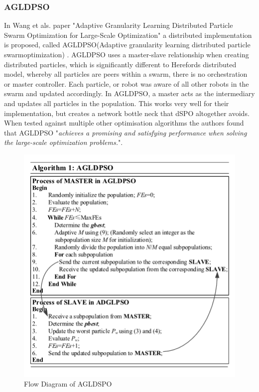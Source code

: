 \documentclass[oneside,12pt]{book}
\begin{document}
\subsubsection{AGLDPSO}
In Wang et als. paper "Adaptive Granularity Learning Distributed Particle Swarm Optimization for Large-Scale Optimization" a distributed implementation is proposed, called AGLDPSO(Adaptive granularity learning distributed particle swarmoptimization) \cite{wang2020adaptive}. AGLDPSO uses a master-slave relationship when creating distributed particles, which is significantly different to Herefords distributed model, whereby all particles are peers within a swarm, there is no orchestration or master controller. Each particle, or robot was aware of all other robots in the swarm and updated accordingly. In AGLDPSO, a master acts as the intermediary and updates all particles in the population. This works very well for their implementation, but creates a network bottle neck that dSPO altogether avoids. When tested against multiple other optimisation algorithms the authors found that AGLDPSO "\textit{achieves a promising and satisfying performance when solving the large-scale optimization problems.}". 
\begin{figure}[H]
    \centering
    \includegraphics[scale=0.8]{Images/AGLDPSO.png}
    \caption{Flow Diagram of AGLDSPO \protect\cite{wang2020adaptive} }
    \label{fig:Flow Diagram of AGLDSPO}
\end{figure}
\end{document}
